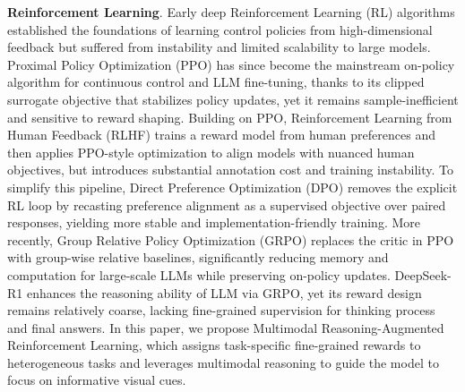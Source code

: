 \noindent\textbf{Reinforcement Learning}. Early deep Reinforcement Learning (RL) algorithms \cite{mnih2015dqn,lillicrap2015ddpg,schulman2015trpo} established the foundations of learning control policies from high-dimensional feedback but suffered from instability and limited scalability to large models. Proximal Policy Optimization (PPO) \cite{schulman2017ppo} has since become the mainstream on-policy algorithm for continuous control and LLM fine-tuning, thanks to its clipped surrogate objective that stabilizes policy updates, yet it remains sample-inefficient and sensitive to reward shaping. Building on PPO, Reinforcement Learning from Human Feedback (RLHF) \cite{christiano2017rlhf,ouyang2022instructgpt} trains a reward model from human preferences and then applies PPO-style optimization to align models with nuanced human objectives, but introduces substantial annotation cost and training instability. To simplify this pipeline, Direct Preference Optimization (DPO) \cite{rafailov2023dpo} removes the explicit RL loop by recasting preference alignment as a supervised objective over paired responses, yielding more stable and implementation-friendly training. More recently, Group Relative Policy Optimization (GRPO) \cite{shao2024deepseekmath} replaces the critic in PPO with group-wise relative baselines, significantly reducing memory and computation for large-scale LLMs while preserving on-policy updates. DeepSeek-R1 \cite{guo2025deepseek} enhances the reasoning ability of LLM via GRPO, yet its reward design remains relatively coarse, lacking fine-grained supervision for thinking process and final answers. In this paper, we propose Multimodal Reasoning-Augmented Reinforcement Learning, which assigns task-specific fine-grained rewards to heterogeneous tasks and leverages multimodal reasoning to guide the model to focus on informative visual cues.

